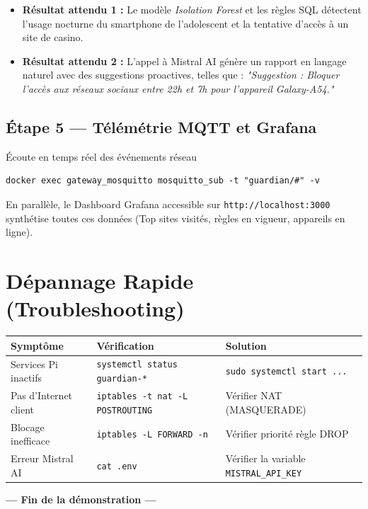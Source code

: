 \documentclass[11pt,a4paper]{article}
\begin{document}
\begin{itemize}
    \item \textbf{Résultat attendu 1 :} Le modèle \textit{Isolation Forest} et les règles SQL détectent l'usage nocturne du smartphone de l'adolescent et la tentative d'accès à un site de casino.
    \item \textbf{Résultat attendu 2 :} L'appel à Mistral AI génère un rapport en langage naturel avec des suggestions proactives, telles que : \textit{"Suggestion : Bloquer l'accès aux réseaux sociaux entre 22h et 7h pour l'appareil Galaxy-A54."}
\end{itemize}

\subsection{Étape 5 — Télémétrie MQTT et Grafana}
\begin{stepcadre}{Écoute en temps réel des événements réseau}
\begin{lstlisting}[language=BashShell]
docker exec gateway_mosquitto mosquitto_sub -t "guardian/#" -v
\end{lstlisting}
\end{stepcadre}
En parallèle, le Dashboard Grafana accessible sur \texttt{http://localhost:3000} synthétise toutes ces données (Top sites visités, règles en vigueur, appareils en ligne).

\section{Dépannage Rapide (Troubleshooting)}

\begin{center}
\small
\begin{tabularx}{\textwidth}{|l|l|X|}
\hline
\rowcolor{lightred!50}\textbf{Symptôme} & \textbf{Vérification} & \textbf{Solution} \\ \hline
Services Pi inactifs & \texttt{systemctl status guardian-*} & \texttt{sudo systemctl start ...} \\ \hline
Pas d'Internet client & \texttt{iptables -t nat -L POSTROUTING} & Vérifier NAT (MASQUERADE) \\ \hline
Blocage inefficace & \texttt{iptables -L FORWARD -n} & Vérifier priorité règle DROP \\ \hline
Erreur Mistral AI & \texttt{cat .env} & Vérifier la variable \texttt{MISTRAL\_API\_KEY} \\ \hline
\end{tabularx}
\end{center}

\vspace{1cm}
\begin{center}
\textbf{\large --- Fin de la démonstration ---}
\end{center}
\end{document}
